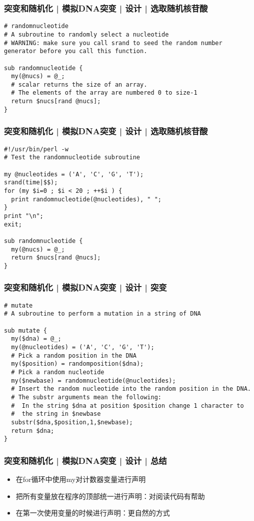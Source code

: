 \begin{frame}[fragile]
  \frametitle{突变和随机化 | 模拟DNA突变 | 设计 | 选取随机核苷酸}
  \vspace{-1.5em}
\begin{lstlisting}
# randomnucleotide
# A subroutine to randomly select a nucleotide
# WARNING: make sure you call srand to seed the random number generator before you call this function.

sub randomnucleotide {
  my(@nucs) = @_;
  # scalar returns the size of an array. 
  # The elements of the array are numbered 0 to size-1
  return $nucs[rand @nucs];
}
\end{lstlisting}
\end{frame}

\begin{frame}[fragile]
  \frametitle{突变和随机化 | 模拟DNA突变 | 设计 | \alert{选取随机核苷酸}}
  \vspace{-1.5em}
\begin{lstlisting}
#!/usr/bin/perl -w
# Test the randomnucleotide subroutine

my @nucleotides = ('A', 'C', 'G', 'T');
srand(time|$$);
for (my $i=0 ; $i < 20 ; ++$i ) {
  print randomnucleotide(@nucleotides), " ";
}
print "\n";
exit;

sub randomnucleotide {
  my(@nucs) = @_;
  return $nucs[rand @nucs];
}
\end{lstlisting}
\end{frame}

\begin{frame}[fragile]
  \frametitle{突变和随机化 | 模拟DNA突变 | 设计 | \alert{突变}}
  \vspace{-1.5em}
\begin{lstlisting}[basicstyle=\footnotesize\tt,numberstyle=\scriptsize]
# mutate
# A subroutine to perform a mutation in a string of DNA

sub mutate {
  my($dna) = @_;
  my(@nucleotides) = ('A', 'C', 'G', 'T');
  # Pick a random position in the DNA
  my($position) = randomposition($dna);
  # Pick a random nucleotide
  my($newbase) = randomnucleotide(@nucleotides);
  # Insert the random nucleotide into the random position in the DNA.
  # The substr arguments mean the following:
  #  In the string $dna at position $position change 1 character to
  #  the string in $newbase
  substr($dna,$position,1,$newbase);
  return $dna;
}
\end{lstlisting}
\end{frame}

\begin{frame}[fragile]
  \frametitle{突变和随机化 | 模拟DNA突变 | 设计 | \alert{总结}}
  \begin{itemize}
    \item 在for循环中使用my对计数器变量进行声明
    \item 把所有变量放在程序的顶部统一进行声明：对阅读代码有帮助
    \item 在第一次使用变量的时候进行声明：更自然的方式
  \end{itemize}
\end{frame}

